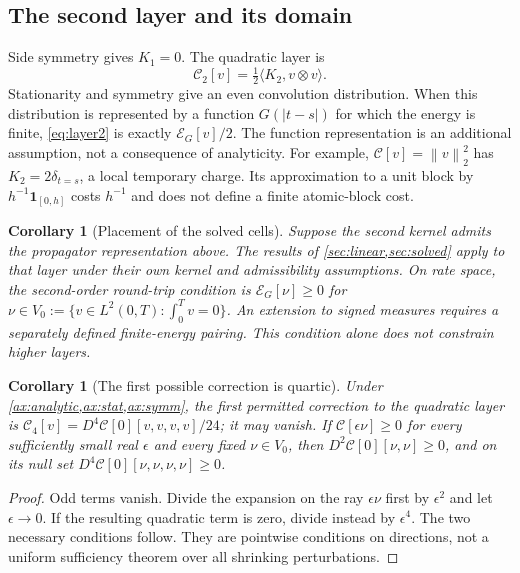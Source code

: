 \documentclass[11pt]{article}
\newcommand{\norm}[1]{\left\lVert #1\right\rVert}
\numberwithin{equation}{section}
\newtheorem{corollary}[theorem]{Corollary}
\theoremstyle{definition}
\theoremstyle{remark}
\theoremstyle{definition}
\begin{document}
\subsection{The second layer and its domain}
Side symmetry gives $K_1=0$. The quadratic layer is
\begin{equation}\label{eq:layer2}
 \mathcal C_2[v]=\tfrac12\langle K_2,v\otimes v\rangle .
\end{equation}
Stationarity and symmetry give an even convolution distribution. When this
distribution is represented by a function $G(|t-s|)$ for which the energy is
finite, \eqref{eq:layer2} is exactly $\mathcal E_G[v]/2$. The function
representation is an additional assumption, not a consequence of analyticity.
For example, $\mathcal C[v]=\norm v_2^2$ has
$K_2=2\delta_{t=s}$, a local temporary charge. Its approximation to a unit
block by $h^{-1}\mathbf1_{[0,h]}$ costs $h^{-1}$ and does not define a finite
atomic-block cost.

\begin{corollary}[Placement of the solved cells]\label{cor:placement}
Suppose the second kernel admits the propagator representation above.
The results of \cref{sec:linear,sec:solved} apply to that layer under their
own kernel and admissibility assumptions. On rate space, the second-order
round-trip condition is $\mathcal E_G[\nu]\ge0$ for
$\nu\in V_0:=\{v\in L^2(0,T):\int_0^Tv=0\}$. An extension to signed
measures requires a separately defined finite-energy pairing. This condition
alone does not constrain higher layers.
\end{corollary}

\begin{corollary}[The first possible correction is quartic]\label{cor:quartic}
Under \cref{ax:analytic,ax:stat,ax:symm}, the first permitted correction to
the quadratic layer is
$\mathcal C_4[v]=D^4\mathcal C[0][v,v,v,v]/24$; it may vanish.
If $\mathcal C[\epsilon\nu]\ge0$ for every sufficiently small real
$\epsilon$ and every fixed $\nu\in V_0$, then
$D^2\mathcal C[0][\nu,\nu]\ge0$, and on its null set
$D^4\mathcal C[0][\nu,\nu,\nu,\nu]\ge0$.
\end{corollary}
\begin{proof}
Odd terms vanish. Divide the expansion on the ray $\epsilon\nu$ first by
$\epsilon^2$ and let $\epsilon\to0$. If the resulting quadratic term is
zero, divide instead by $\epsilon^4$. The two necessary conditions follow.
They are pointwise conditions on directions, not a uniform sufficiency theorem
over all shrinking perturbations.
\end{proof}
\end{document}
